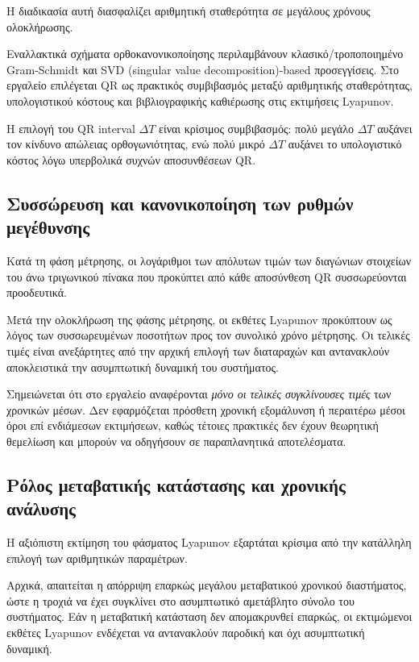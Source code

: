 \documentclass[11pt,a4paper]{report}
\begin{document}
Η διαδικασία αυτή διασφαλίζει αριθμητική σταθερότητα σε μεγάλους χρόνους
ολοκλήρωσης.

Εναλλακτικά σχήματα ορθοκανονικοποίησης περιλαμβάνουν κλασικό/τροποποιημένο Gram-Schmidt
και SVD (singular value decomposition)-based προσεγγίσεις. Στο εργαλείο επιλέγεται QR ως πρακτικός συμβιβασμός μεταξύ
αριθμητικής σταθερότητας, υπολογιστικού κόστους και βιβλιογραφικής καθιέρωσης στις εκτιμήσεις Lyapunov.

Η επιλογή του QR interval $\Delta T$ είναι κρίσιμος συμβιβασμός: πολύ μεγάλο $\Delta T$ αυξάνει
τον κίνδυνο απώλειας ορθογωνιότητας, ενώ πολύ μικρό $\Delta T$ αυξάνει το υπολογιστικό κόστος
λόγω υπερβολικά συχνών αποσυνθέσεων QR.

\subsection{Συσσώρευση και κανονικοποίηση των ρυθμών μεγέθυνσης}

Κατά τη φάση μέτρησης, οι λογάριθμοι των απόλυτων τιμών των διαγώνιων
στοιχείων του άνω τριγωνικού πίνακα που προκύπτει από κάθε αποσύνθεση QR
συσσωρεύονται προοδευτικά.

Μετά την ολοκλήρωση της φάσης μέτρησης, οι εκθέτες Lyapunov προκύπτουν ως
λόγος των συσσωρευμένων ποσοτήτων προς τον συνολικό χρόνο μέτρησης.
Οι τελικές τιμές είναι ανεξάρτητες από την αρχική επιλογή των διαταραχών
και αντανακλούν αποκλειστικά την ασυμπτωτική δυναμική του συστήματος.

Σημειώνεται ότι στο εργαλείο αναφέρονται \emph{μόνο οι τελικές συγκλίνουσες
τιμές} των χρονικών μέσων.
Δεν εφαρμόζεται πρόσθετη χρονική εξομάλυνση ή περαιτέρω μέσοι όροι επί
ενδιάμεσων εκτιμήσεων, καθώς τέτοιες πρακτικές δεν έχουν θεωρητική
θεμελίωση και μπορούν να οδηγήσουν σε παραπλανητικά αποτελέσματα.

\subsection{Ρόλος μεταβατικής κατάστασης και χρονικής ανάλυσης}

Η αξιόπιστη εκτίμηση του φάσματος Lyapunov εξαρτάται κρίσιμα από την
κατάλληλη επιλογή των αριθμητικών παραμέτρων.

Αρχικά, απαιτείται η απόρριψη επαρκώς μεγάλου μεταβατικού χρονικού
διαστήματος, ώστε η τροχιά να έχει συγκλίνει στο ασυμπτωτικό αμετάβλητο
σύνολο του συστήματος. Εάν η μεταβατική κατάσταση δεν απομακρυνθεί
επαρκώς, οι εκτιμώμενοι εκθέτες Lyapunov ενδέχεται να αντανακλούν
παροδική και όχι ασυμπτωτική δυναμική.
\end{document}
